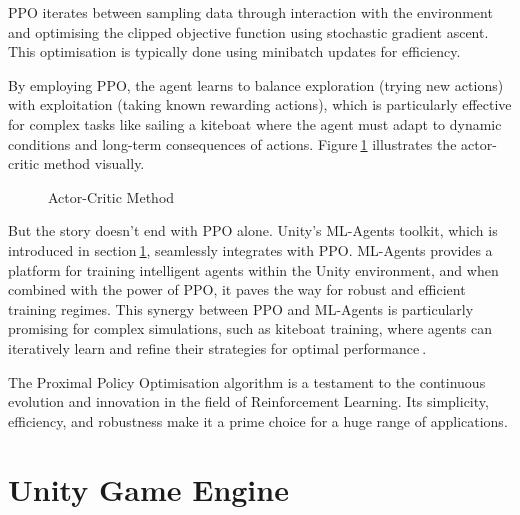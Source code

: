 PPO iterates between sampling data through interaction with the environment and optimising the clipped objective function using stochastic gradient ascent. This optimisation is typically done using minibatch updates for efficiency.

By employing PPO, the agent learns to balance exploration (trying new actions) with exploitation (taking known rewarding actions), which is particularly effective for complex tasks like sailing a kiteboat where the agent must adapt to dynamic conditions and long-term consequences of actions. Figure$~$\ref{actor_critic} illustrates the actor-critic method visually.

\begin{figure}
    \centering
    \caption{Actor-Critic Method}\label{actor_critic}
\end{figure}

But the story doesn't end with PPO alone. Unity's ML-Agents toolkit, which is introduced in section$~$\ref{unity}, seamlessly integrates with PPO. ML-Agents provides a platform for training intelligent agents within the Unity environment, and when combined with the power of PPO, it paves the way for robust and efficient training regimes. This synergy between PPO and ML-Agents is particularly promising for complex simulations, such as kiteboat training, where agents can iteratively learn and refine their strategies for optimal performance$~$\cite{mlagents_ppo}.

The Proximal Policy Optimisation algorithm is a testament to the continuous evolution and innovation in the field of Reinforcement Learning. Its simplicity, efficiency, and robustness make it a prime choice for a huge range of applications. 

\section{Unity Game Engine}\label{unity}

